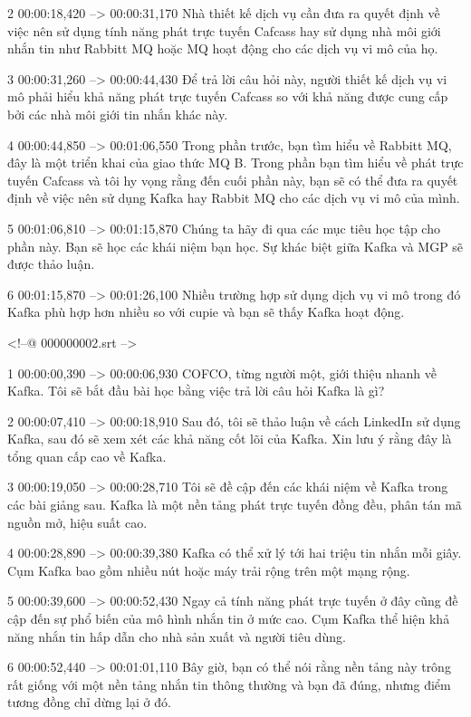 2
00:00:18,420 --> 00:00:31,170
Nhà thiết kế dịch vụ cần đưa ra quyết định về việc nên sử dụng tính năng phát trực tuyến Cafcass hay sử dụng nhà môi giới nhắn tin như Rabbitt MQ hoặc MQ hoạt động cho các dịch vụ vi mô của họ.

3
00:00:31,260 --> 00:00:44,430
Để trả lời câu hỏi này, người thiết kế dịch vụ vi mô phải hiểu khả năng phát trực tuyến Cafcass so với khả năng được cung cấp bởi các nhà môi giới tin nhắn khác này.

4
00:00:44,850 --> 00:01:06,550
Trong phần trước, bạn tìm hiểu về Rabbitt MQ, đây là một triển khai của giao thức MQ B.  Trong phần bạn tìm hiểu về phát trực tuyến Cafcass và tôi hy vọng rằng đến cuối phần này, bạn sẽ có thể đưa ra quyết định về việc nên sử dụng Kafka hay Rabbit MQ cho các dịch vụ vi mô của mình.

5
00:01:06,810 --> 00:01:15,870
Chúng ta hãy đi qua các mục tiêu học tập cho phần này.  Bạn sẽ học các khái niệm bạn học.  Sự khác biệt giữa Kafka và MGP sẽ được thảo luận.

6
00:01:15,870 --> 00:01:26,100
Nhiều trường hợp sử dụng dịch vụ vi mô trong đó Kafka phù hợp hơn nhiều so với cupie và bạn sẽ thấy Kafka hoạt động.

<!--@ 000000002.srt -->

1
00:00:00,390 --> 00:00:06,930
COFCO, từng người một, giới thiệu nhanh về Kafka.  Tôi sẽ bắt đầu bài học bằng việc trả lời câu hỏi Kafka là gì?

2
00:00:07,410 --> 00:00:18,910
Sau đó, tôi sẽ thảo luận về cách LinkedIn sử dụng Kafka, sau đó sẽ xem xét các khả năng cốt lõi của Kafka.  Xin lưu ý rằng đây là tổng quan cấp cao về Kafka.

3
00:00:19,050 --> 00:00:28,710
Tôi sẽ đề cập đến các khái niệm về Kafka trong các bài giảng sau.  Kafka là một nền tảng phát trực tuyến đồng đều, phân tán mã nguồn mở, hiệu suất cao.

4
00:00:28,890 --> 00:00:39,380
Kafka có thể xử lý tới hai triệu tin nhắn mỗi giây.  Cụm Kafka bao gồm nhiều nút hoặc máy trải rộng trên một mạng rộng.

5
00:00:39,600 --> 00:00:52,430
Ngay cả tính năng phát trực tuyến ở đây cũng đề cập đến sự phổ biến của mô hình nhắn tin ở mức cao.  Cụm Kafka thể hiện khả năng nhắn tin hấp dẫn cho nhà sản xuất và người tiêu dùng.

6
00:00:52,440 --> 00:01:01,110
Bây giờ, bạn có thể nói rằng nền tảng này trông rất giống với một nền tảng nhắn tin thông thường và bạn đã đúng, nhưng điểm tương đồng chỉ dừng lại ở đó.

